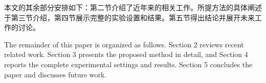 本文的其余部分安排如下：第二节介绍了近年来的相关工作。所提方法的具体阐述于第三节介绍，第四节展示完整的实验设置和结果。第五节得出结论并展开未来工作的讨论。

The remainder of this paper is organized as follows. Section 2 reviews recent related work. Section 3 presents the proposed method in detail, and Section 4 reports the complete experimental settings and results. Section 5 concludes the paper and discusses future work.
